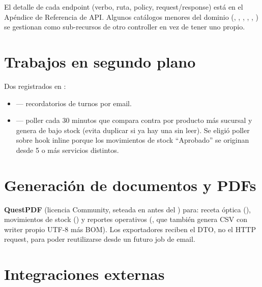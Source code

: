 El detalle de cada endpoint (verbo, ruta, policy, request/response) está en el Apéndice de Referencia de API. Algunos catálogos menores del dominio (, , , , , ) se gestionan como sub-recursos de otro controller en vez de tener uno propio.

\section{Trabajos en segundo plano}
\label{sec:arch-background-services}

Dos  registrados en \allowbreak {}:
\begin{itemize}
  \item \textbf{\allowbreak {}\allowbreak {}} --- recordatorios de turnos por email.
  \item \textbf{\allowbreak {}\allowbreak {}\allowbreak {}} --- poller cada 30 minutos que compara  contra \allowbreak {}\allowbreak {} por producto más sucursal y genera \allowbreak {} de bajo stock (evita duplicar si ya hay una sin leer). Se eligió poller sobre hook inline porque los movimientos de stock ``Aprobado'' se originan desde 5 o más servicios distintos.
\end{itemize}

\section{Generación de documentos y PDFs}
\label{sec:arch-pdf}

\textbf{QuestPDF} (licencia Community, seteada en  antes del ) para: receta óptica (\allowbreak {}\allowbreak {}), movimientos de stock (\allowbreak {}\allowbreak {}\allowbreak {}) y reportes operativos (, que también genera CSV con writer propio UTF-8 más BOM). Los exportadores reciben el DTO, no el HTTP request, para poder reutilizarse desde un futuro job de email.

\section{Integraciones externas}
\label{sec:arch-integraciones}

